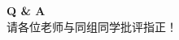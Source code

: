 \documentclass[aspectratio=169,10pt,UTF8]{ctexbeamer}
\begin{document}
\begin{frame}[plain]
  \begin{center}
    \Huge \textcolor{AcademiaBlue}{\textbf{Q \& A}} \\
    \vspace{0.5cm}
    \normalsize 请各位老师与同组同学批评指正！
  \end{center}
\end{frame}
\end{document}

